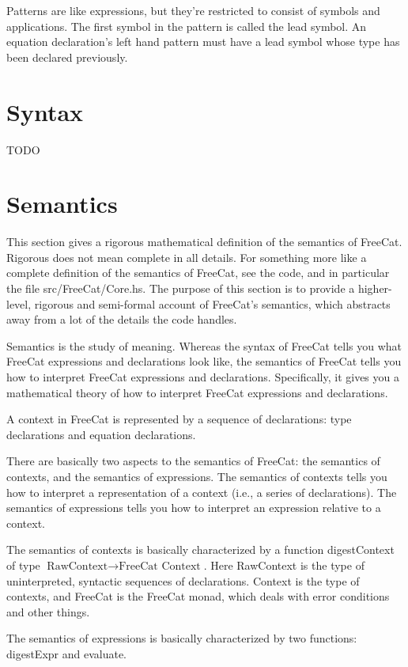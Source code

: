 \documentclass{article}
\begin{document}
Patterns are like expressions, but they're restricted to consist of symbols and applications. The first symbol in the pattern is called the lead symbol. An equation declaration's left hand pattern must have a lead symbol whose type has been declared previously.

\section{Syntax}

TODO

\section{Semantics}

This section gives a rigorous mathematical definition of the semantics of FreeCat. Rigorous does not mean complete in all details. For something more like a complete definition of the semantics of FreeCat, see the code, and in particular the file src/FreeCat/Core.hs. The purpose of this section is to provide a higher-level, rigorous and semi-formal account of FreeCat's semantics, which abstracts away from a lot of the details the code handles.

Semantics is the study of meaning. Whereas the syntax of FreeCat tells you what FreeCat expressions and declarations look like, the semantics of FreeCat tells you how to interpret FreeCat expressions and declarations. Specifically, it gives you a mathematical theory of how to interpret FreeCat expressions and declarations.

A context in FreeCat is represented by a sequence of declarations: type declarations and equation declarations.

There are basically two aspects to the semantics of FreeCat: the semantics of contexts, and the semantics of expressions. The semantics of contexts tells you how to interpret a representation of a context (i.e., a series of declarations). The semantics of expressions tells you how to interpret an expression relative to a context.

The semantics of contexts is basically characterized by a function digestContext of type $\text{RawContext} \to \text{FreeCat Context}$. Here RawContext is the type of uninterpreted, syntactic sequences of declarations. Context is the type of contexts, and FreeCat is the FreeCat monad, which deals with error conditions and other things.

The semantics of expressions is basically characterized by two functions: digestExpr and evaluate.
\end{document}
